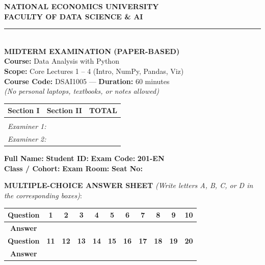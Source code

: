 \documentclass[11pt,a4paper]{article}
\begin{document}
\noindent
\begin{minipage}[t]{0.54\textwidth}
  \centering
  \textbf{NATIONAL ECONOMICS UNIVERSITY}\\
  \textbf{FACULTY OF DATA SCIENCE \& AI}\\
  \rule{4.5cm}{0.4pt}\\[1.5mm]
  \textbf{MIDTERM EXAMINATION (PAPER-BASED)}\\
  \textbf{Course:} Data Analysis with Python\\
  \textbf{Scope:} Core Lectures 1 -- 4 (Intro, NumPy, Pandas, Viz)\\
  \textbf{Course Code:} DSAI1005 --- \textbf{Duration:} 60 minutes\\
  \textit{\small (No personal laptops, textbooks, or notes allowed)}
\end{minipage}
\hfill
\begin{minipage}[t]{0.43\textwidth}
  \begin{tabular}{|p{2.2cm}|p{2.2cm}|p{2.2cm}|}
    \hline
    \centering \textbf{Section I} & \centering \textbf{Section II} & \centering \textbf{TOTAL} \tabularnewline
    \hline
    & & \\[0.8cm]
    \hline
    \multicolumn{3}{|l|}{\small \textit{Examiner 1:}} \tabularnewline
    \multicolumn{3}{|l|}{\small \textit{Examiner 2:}} \tabularnewline
    \hline
  \end{tabular}
\end{minipage}

\vspace{2mm}
\noindent
\textbf{Full Name:} \dotfill{} \textbf{Student ID:} \dotfill{} \textbf{Exam Code:} \textbf{201-EN}\\
\textbf{Class / Cohort:} \dotfill{} \textbf{Exam Room:} \dotfill{} \textbf{Seat No:} \dotfill

\vspace{2mm}
\noindent
\textbf{MULTIPLE-CHOICE ANSWER SHEET} \textit{(Write letters A, B, C, or D in the corresponding boxes)}:
\begin{center}
\begin{tabular}{|c|c|c|c|c|c|c|c|c|c|c|}
  \hline
  \textbf{Question} & \textbf{1} & \textbf{2} & \textbf{3} & \textbf{4} & \textbf{5} & \textbf{6} & \textbf{7} & \textbf{8} & \textbf{9} & \textbf{10} \\
  \hline
  \textbf{Answer} & & & & & & & & & & \\[3mm]
  \hline
  \hline
  \textbf{Question} & \textbf{11} & \textbf{12} & \textbf{13} & \textbf{14} & \textbf{15} & \textbf{16} & \textbf{17} & \textbf{18} & \textbf{19} & \textbf{20} \\
  \hline
  \textbf{Answer} & & & & & & & & & & \\[3mm]
  \hline
\end{tabular}
\end{center}
\end{document}
